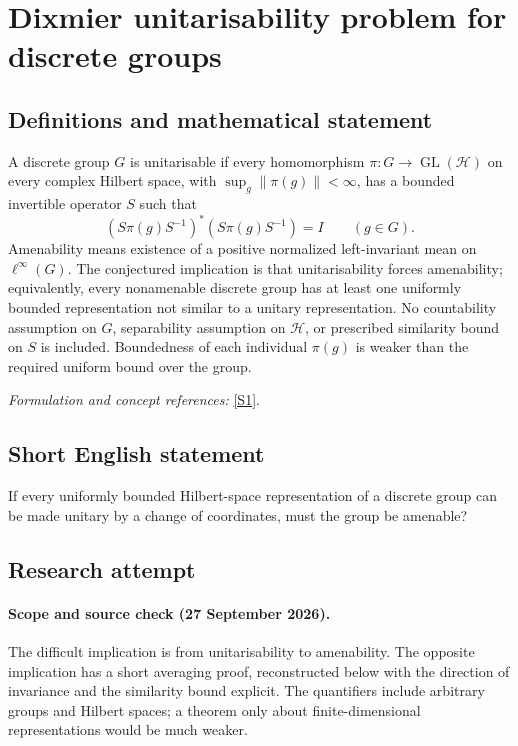 \documentclass[11pt]{article}
\begin{document}
\section*{\texorpdfstring{Dixmier unitarisability problem for discrete groups}{Dixmier unitarisability problem for discrete groups}}\label{376}
\subsection{Definitions and mathematical statement}
A discrete group $G$ is unitarisable if every homomorphism $\pi:G\to\operatorname{GL}(\mathcal H)$ on every complex Hilbert space, with $\sup_g\|\pi(g)\|<\infty$, has a bounded invertible operator $S$ such that
\[
 (S\pi(g)S^{-1})^*(S\pi(g)S^{-1})=I\qquad(g\in G).
\]
Amenability means existence of a positive normalized left-invariant mean on $\ell^\infty(G)$. The conjectured implication is that unitarisability forces amenability; equivalently, every nonamenable discrete group has at least one uniformly bounded representation not similar to a unitary representation. No countability assumption on $G$, separability assumption on $\mathcal H$, or prescribed similarity bound on $S$ is included. Boundedness of each individual $\pi(g)$ is weaker than the required uniform bound over the group.
\par\smallskip\textit{Formulation and concept references:} \href{https://arxiv.org/pdf/0902.4585v1}{[S1]}.

\subsection{Short English statement}
If every uniformly bounded Hilbert-space representation of a discrete group can be made unitary by a change of coordinates, must the group be amenable?
\subsection{Research attempt}
\paragraph{Scope and source check (27 September 2026).}
The difficult implication is from unitarisability to amenability. The
opposite implication has a short averaging proof, reconstructed below
with the direction of invariance and the similarity bound explicit.
The quantifiers include arbitrary groups and Hilbert spaces; a theorem
only about finite-dimensional representations would be much weaker.
\end{document}
